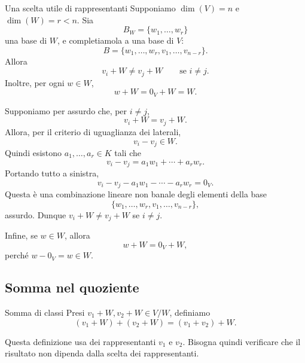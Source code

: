 \documentclass[a4paper]{article}
\begin{document}
\begin{radioactive}
\begin{snippetproposition}{Una scelta utile di rappresentanti}
    Supponiamo \(\dim(V)=n\) e \(\dim(W)=r<n\).
    Sia
    \[
        B_W=\{w_1,\ldots,w_r\}
    \]
    una base di \(W\), e completiamola a una base di \(V\):
    \[
        B=\{w_1,\ldots,w_r,v_1,\ldots,v_{n-r}\}.
    \]
    Allora
    \[
        v_i+W \neq v_j+W
        \qquad
        \text{se } i \neq j.
    \]
    Inoltre, per ogni \(w \in W\),
    \[
        w+W = 0_V+W = W.
    \]
\end{snippetproposition}
\end{radioactive}

\begin{radioactive}
\begin{snippetproof}{}
    Supponiamo per assurdo che, per \(i\neq j\),
    \[
        v_i+W = v_j+W.
    \]
    Allora, per il criterio di uguaglianza dei laterali,
    \[
        v_i-v_j \in W.
    \]
    Quindi esistono \(a_1,\ldots,a_r \in K\) tali che
    \[
        v_i-v_j = a_1w_1+\cdots+a_rw_r.
    \]
    Portando tutto a sinistra,
    \[
        v_i-v_j-a_1w_1-\cdots-a_rw_r=0_V.
    \]
    Questa è una combinazione lineare non banale degli elementi della base
    \[
        \{w_1,\ldots,w_r,v_1,\ldots,v_{n-r}\},
    \]
    assurdo. Dunque \(v_i+W \neq v_j+W\) se \(i\neq j\).

    Infine, se \(w \in W\), allora
    \[
        w+W = 0_V+W,
    \]
    perché \(w-0_V=w \in W\).
\end{snippetproof}
\end{radioactive}

\subsection{Somma nel quoziente}

\begin{radioactive}
\begin{snippetdefinition}{Somma di classi}
    Presi \(v_1+W, v_2+W \in V/W\), definiamo
    \[
        (v_1+W)+(v_2+W)
        =
        (v_1+v_2)+W.
    \]
\end{snippetdefinition}
\end{radioactive}

\begin{radioactive}
Questa definizione usa dei rappresentanti \(v_1\) e \(v_2\). Bisogna quindi verificare che il risultato non dipenda dalla scelta dei rappresentanti.
\end{radioactive}
\end{document}
